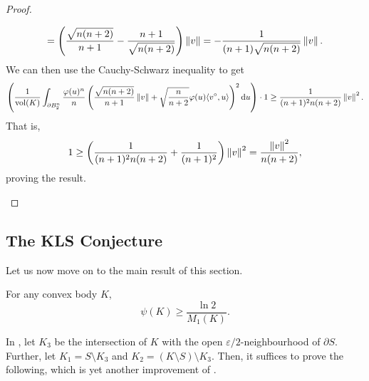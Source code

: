 \documentclass{article}
\begin{document}
\begin{proof}
\begin{itemize}
\begin{multline*}
					= \left(\frac{\sqrt{n(n+2)}}{n+1} - \frac{n+1}{\sqrt{n(n+2)}}\right)\left\lVert v\right\rVert = -\frac{1}{(n+1)\sqrt{n(n+2)}}\left\lVert v\right\rVert.
				\end{multline*}
				We can then use the Cauchy-Schwarz inequality to get
				\[ \left( \frac{1}{\operatorname{vol}(K)} \int_{\partial B_2^n} \frac{\varphi(u)^n}{n} \left(\frac{\sqrt{n(n+2)}}{n+1}\left\lVert v\right\rVert + \sqrt{\frac{n}{n+2}}\varphi(u)\langle v^\circ, u\rangle\right)^2 \operatorname{d}\!{u} \right) \cdot 1 \geq \frac{1}{(n+1)^2n(n+2)}\left\lVert v\right\rVert^2. \]
				That is,
				\[ 1 \geq \left(\frac{1}{(n+1)^2n(n+2)} + \frac{1}{(n+1)^2}\right)\left\lVert v\right\rVert^2 = \frac{\left\lVert v\right\rVert^2}{n(n+2)}, \]
				proving the result.
			\end{itemize}	
		\end{proof}

	\subsection{The KLS Conjecture}

		Let us now move on to the main result of this section.

		\begin{ftheo}
			\label{isoperimetric coefficient bound 1}
			For any convex body $K$,
			\[ \psi(K) \geq \frac{\ln 2}{M_1(K)}. \]
		\end{ftheo}

		In , let $K_3$ be the intersection of $K$ with the open $\varepsilon/2$-neighbourhood of $\partial S$. Further, let $K_1 = S\setminus K_3$ and $K_2 = (K\setminus S)\setminus K_3$. Then, it suffices to prove the following, which is yet another improvement of .
\end{document}
